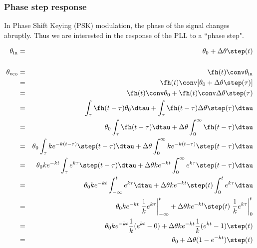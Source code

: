 \subsubsection{Phase step response}
In Phase Shift Keying (PSK) modulation, the phase of the signal changes
abruptly. Thus we are interested in the response of the PLL
to a ``phase step".

\begin{eqnarray*}
  \theta_{\mathrm{in}} &=& \theta_0 + \Delta\theta\step(t)
\\
\\
  \theta_{\mathrm{vco}}
    &=& \fh(t) \conv \theta_{\mathrm{in}}
  \\&=& \fh(t) \conv [\theta_0 + \Delta\theta\step(\tau)]
  \\&=& \fh(t)\conv\theta_0 + \fh(t)\conv\Delta\theta\step(\tau)
  \\&=& \int_{\tau}\fh(t-\tau)\theta_0\dtau + \int_{\tau}\fh(t-\tau)\Delta\theta\step(\tau)\dtau
  \\&=& \theta_0\int_{\tau}\fh(t-\tau)\dtau + \Delta\theta\int_0^\infty\fh(t-\tau)\dtau
  \\&=& \theta_0\int_{\tau} k e^{-k(t-\tau)}\step(t-\tau)\dtau + 
        \Delta\theta\int_0^\infty ke^{-k(t-\tau)}\step(t-\tau) \dtau
  \\&=& \theta_0 k e^{-kt} \int_{\tau} e^{k\tau}\step(t-\tau)\dtau + 
        \Delta\theta ke^{-kt} \int_0^\infty e^{k\tau}\step(t-\tau) \dtau
  \\&=& \theta_0 k e^{-kt} \int_{-\infty}^t e^{k\tau}\dtau + 
        \Delta\theta ke^{-kt} \step(t) \int_0^t e^{k\tau} \dtau
  \\&=& \theta_0 k e^{-kt} \left. \frac{1}{k} e^{k\tau}\right|_{-\infty}^t + 
        \Delta\theta ke^{-kt} \step(t)  \left. \frac{1}{k} e^{k\tau}\right|_0^t
  \\&=& \theta_0 k e^{-kt} \frac{1}{k}(e^{kt}-0) + 
        \Delta\theta ke^{-kt} \frac{1}{k}(e^{kt}-1) \step(t) 
  \\&=& \theta_0  + \Delta\theta (1-e^{-kt}) \step(t) 
\end{eqnarray*}

